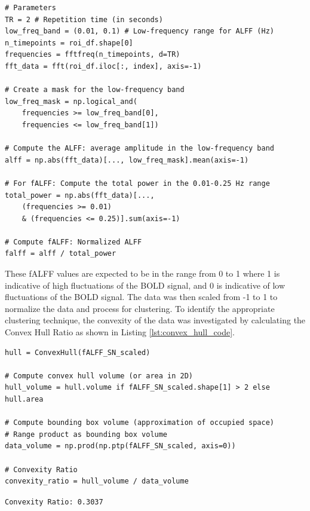 \documentclass[12pt]{article}
\begin{document}
\begin{center}
    \begin{lstlisting}[caption={fALFF Calculation}, label={lst:fALFF_code}]
# Parameters
TR = 2 # Repetition time (in seconds)
low_freq_band = (0.01, 0.1) # Low-frequency range for ALFF (Hz)
n_timepoints = roi_df.shape[0]
frequencies = fftfreq(n_timepoints, d=TR)
fft_data = fft(roi_df.iloc[:, index], axis=-1)

# Create a mask for the low-frequency band
low_freq_mask = np.logical_and(
    frequencies >= low_freq_band[0], 
    frequencies <= low_freq_band[1])

# Compute the ALFF: average amplitude in the low-frequency band
alff = np.abs(fft_data)[..., low_freq_mask].mean(axis=-1)

# For fALFF: Compute the total power in the 0.01-0.25 Hz range
total_power = np.abs(fft_data)[..., 
    (frequencies >= 0.01) 
    & (frequencies <= 0.25)].sum(axis=-1)

# Compute fALFF: Normalized ALFF
falff = alff / total_power
\end{lstlisting}
\end{center}

\FloatBarrier

These fALFF values are expected to be in the range from 0 to 1 where 1 is indicative of high fluctuations of the BOLD signal,
and 0 is indicative of low fluctuations of the BOLD signal. The data was then scaled from -1 to 1 to normalize the data and process for clustering. To identify the appropriate clustering technique, the convexity of the data was investigated by calculating the Convex Hull Ratio as shown in Listing \ref{lst:convex_hull_code}.

\begin{center}
    \begin{lstlisting}[caption={Convex Hull Ration Calculation}, label={lst:convex_hull_code}]
hull = ConvexHull(fALFF_SN_scaled)

# Compute convex hull volume (or area in 2D)
hull_volume = hull.volume if fALFF_SN_scaled.shape[1] > 2 else hull.area

# Compute bounding box volume (approximation of occupied space)
# Range product as bounding box volume
data_volume = np.prod(np.ptp(fALFF_SN_scaled, axis=0))

# Convexity Ratio
convexity_ratio = hull_volume / data_volume
\end{lstlisting}
\texttt{Convexity Ratio: 0.3037}
\end{center}
\end{document}
